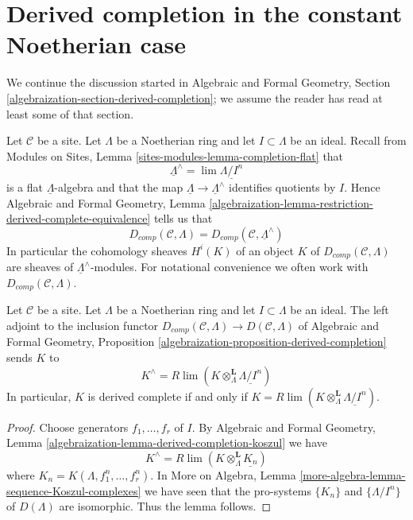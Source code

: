 \section{Derived completion in the constant Noetherian case}
\label{section-derived-completion-noetherian}

\noindent
We continue the discussion started in Algebraic and Formal Geometry, Section
\ref{algebraization-section-derived-completion};
we assume the reader has read at least some of that section.

\medskip\noindent
Let $\mathcal{C}$ be a site. Let $\Lambda$ be a Noetherian ring
and let $I \subset \Lambda$ be an ideal. Recall from
Modules on Sites, Lemma \ref{sites-modules-lemma-completion-flat}
that
$$
\underline{\Lambda}^\wedge = \lim \underline{\Lambda/I^n}
$$
is a flat $\underline{\Lambda}$-algebra and that the map
$\underline{\Lambda} \to \underline{\Lambda}^\wedge$ identifies
quotients by $I$. Hence
Algebraic and Formal Geometry, Lemma
\ref{algebraization-lemma-restriction-derived-complete-equivalence}
tells us that
$$
D_{comp}(\mathcal{C}, \Lambda) =
D_{comp}(\mathcal{C}, \underline{\Lambda}^\wedge)
$$
In particular the cohomology sheaves $H^i(K)$ of an object $K$ of
$D_{comp}(\mathcal{C}, \Lambda)$ are sheaves of
$\underline{\Lambda}^\wedge$-modules.
For notational convenience we often work with
$D_{comp}(\mathcal{C}, \Lambda)$.

\begin{lemma}
\label{lemma-naive-completion}
Let $\mathcal{C}$ be a site. Let $\Lambda$ be a Noetherian ring
and let $I \subset \Lambda$ be an ideal. The left adjoint
to the inclusion functor
$D_{comp}(\mathcal{C}, \Lambda) \to D(\mathcal{C}, \Lambda)$
of Algebraic and Formal Geometry, Proposition
\ref{algebraization-proposition-derived-completion} sends $K$ to
$$
K^\wedge = R\lim(K \otimes_\Lambda^\mathbf{L} \underline{\Lambda/I^n})
$$
In particular, $K$ is derived complete if and only if
$K = R\lim(K \otimes_\Lambda^\mathbf{L} \underline{\Lambda/I^n})$.
\end{lemma}

\begin{proof}
Choose generators $f_1, \ldots, f_r$ of $I$. By
Algebraic and Formal Geometry, Lemma
\ref{algebraization-lemma-derived-completion-koszul}
we have
$$
K^\wedge = 
R\lim (K \otimes_\Lambda^\mathbf{L} \underline{K_n})
$$
where $K_n = K(\Lambda, f_1^n, \ldots, f_r^n)$.
In More on Algebra, Lemma \ref{more-algebra-lemma-sequence-Koszul-complexes}
we have seen that the pro-systems $\{K_n\}$ and
$\{\Lambda/I^n\}$ of $D(\Lambda)$
are isomorphic. Thus the lemma follows.
\end{proof}

